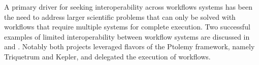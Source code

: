 A primary driver for seeking interoperability across workflows systems
has been the need to address larger scientific problems that can only be
solved with workflows that require multiple systems for complete execution.
Two successful examples of limited interoperability between workflow systems
are discussed in \cite{brooks_triquetrum:_2015} and
\cite{mandal_integrating_2007}. Notably both projects leveraged flavors of
the Ptolemy framework, namely Triquetrum and Kepler, and delegated the
execution of workflows. 






